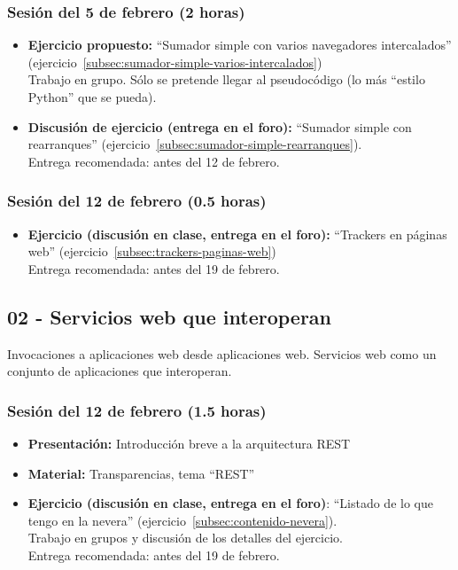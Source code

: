 \documentclass[a4paper,12pt]{article}
\begin{document}
\subsubsection{Sesión del 5 de febrero (2 horas)}

\begin{itemize}
\item \textbf{Ejercicio propuesto:} ``Sumador simple con varios 
navegadores intercalados'' (ejercicio~\ref{subsec:sumador-simple-varios-intercalados}) \\
  Trabajo en grupo. Sólo se pretende llegar al pseudocódigo (lo más ``estilo Python'' que se pueda).
\item \textbf{Discusión de ejercicio (entrega en el foro):} ``Sumador simple con rearranques'' (ejercicio~\ref{subsec:sumador-simple-rearranques}). \\
 Entrega recomendada: antes del 12 de febrero.
\end{itemize}

\subsubsection{Sesión del 12 de febrero (0.5 horas)}

\begin{itemize}
\item \textbf{Ejercicio (discusión en clase, entrega en el foro):} ``Trackers en páginas web'' (ejercicio~\ref{subsec:trackers-paginas-web})  \\
 Entrega recomendada: antes del 19 de febrero.
\end{itemize}

\subsection{02 - Servicios web que interoperan}

Invocaciones a aplicaciones web desde aplicaciones web. Servicios web como un conjunto de aplicaciones que interoperan.

\subsubsection{Sesión del 12 de febrero (1.5 horas)}

\begin{itemize}
\item \textbf{Presentación:} Introducción breve a la arquitectura REST
\item \textbf{Material:} Transparencias, tema ``REST''
\item \textbf{Ejercicio (discusión en clase, entrega en el foro)}: ``Listado de lo que tengo en la nevera'' (ejercicio~\ref{subsec:contenido-nevera}). \\
  Trabajo en grupos y discusión de los detalles del ejercicio. \\
  Entrega recomendada: antes del 19 de febrero.
\end{itemize}
\end{document}
